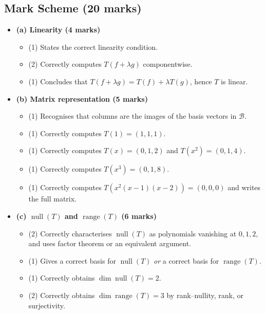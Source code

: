 \documentclass[12pt]{article}
\begin{document}
\subsection{Mark Scheme (20 marks)}
\begin{itemize}[leftmargin=1.6em]
  \item \textbf{(a) Linearity (4 marks)}
  \begin{itemize}[leftmargin=1.6em]
    \item (1) States the correct linearity condition.
    \item (2) Correctly computes $T(f+\lambda g)$ componentwise.
    \item (1) Concludes that $T(f+\lambda g)=T(f)+\lambda T(g)$, hence $T$ is linear.
  \end{itemize}

  \item \textbf{(b) Matrix representation (5 marks)}
  \begin{itemize}[leftmargin=1.6em]
    \item (1) Recognises that columns are the images of the basis vectors in $\mathcal{B}$.
    \item (1) Correctly computes $T(1)=(1,1,1)$.
    \item (1) Correctly computes $T(x)=(0,1,2)$ and $T(x^2)=(0,1,4)$.
    \item (1) Correctly computes $T(x^3)=(0,1,8)$.
    \item (1) Correctly computes $T(x^2(x-1)(x-2))=(0,0,0)$ and writes the full matrix.
  \end{itemize}

  \item \textbf{(c) $\operatorname{null}(T)$ and $\operatorname{range}(T)$ (6 marks)}
  \begin{itemize}[leftmargin=1.6em]
    \item (2) Correctly characterises $\operatorname{null}(T)$ as polynomials vanishing at $0,1,2$, and uses factor theorem or an equivalent argument.
    \item (1) Gives a correct basis for $\operatorname{null}(T)$ \emph{or} a correct basis for $\operatorname{range}(T)$.
    \item (1) Correctly obtains $\dim\operatorname{null}(T)=2$.
    \item (2) Correctly obtains $\dim\operatorname{range}(T)=3$ by rank--nullity, rank, or surjectivity.
  \end{itemize}


\end{itemize}
\end{document}
